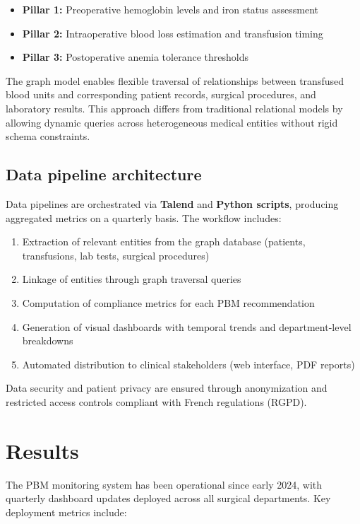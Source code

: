 \documentclass{IOS-Book-Article}
\begin{document}
\begin{itemize}
\item \textbf{Pillar 1:} Preoperative hemoglobin levels and iron status assessment
\item \textbf{Pillar 2:} Intraoperative blood loss estimation and transfusion timing
\item \textbf{Pillar 3:} Postoperative anemia tolerance thresholds
\end{itemize}

The graph model enables flexible traversal of relationships between transfused blood units and corresponding patient records, surgical procedures, and laboratory results. This approach differs from traditional relational models by allowing dynamic queries across heterogeneous medical entities without rigid schema constraints.

\subsection{Data pipeline architecture}

Data pipelines are orchestrated via \textbf{Talend} and \textbf{Python scripts}, producing aggregated metrics on a quarterly basis. The workflow includes:

\begin{enumerate}
\item Extraction of relevant entities from the graph database (patients, transfusions, lab tests, surgical procedures)
\item Linkage of entities through graph traversal queries
\item Computation of compliance metrics for each PBM recommendation
\item Generation of visual dashboards with temporal trends and department-level breakdowns
\item Automated distribution to clinical stakeholders (web interface, PDF reports)
\end{enumerate}

Data security and patient privacy are ensured through anonymization and restricted access controls compliant with French regulations (RGPD).

\section{Results}

The PBM monitoring system has been operational since early 2024, with quarterly dashboard updates deployed across all surgical departments. Key deployment metrics include:
\end{document}
